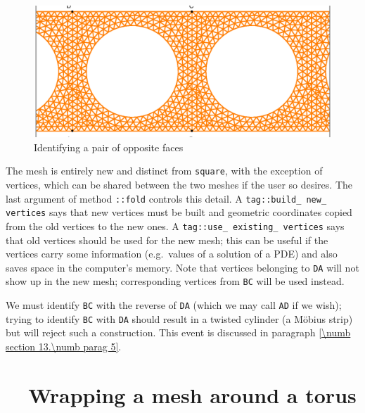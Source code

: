 \begin{figure}[ht] \centering
  \includegraphics[width=120mm]{cylinder-1.eps}
  \caption{Identifying a pair of opposite faces}
  \label{\numb section 7.\numb fig 12}
\end{figure}

The mesh {\small\tt{}} is entirely new and distinct from {\small\tt square},
with the exception of vertices, which can be shared between the two meshes if the
user so desires.
The last argument of method {\small\tt{}::fold} controls this detail.
A {\small\tt\textcolor{tag}{tag}::build\_\,new\_\,vertices} says that new vertices must be built
and geometric coordinates copied from the old vertices to the new ones.
A {\small\tt\textcolor{tag}{tag}::use\_\,existing\_\,vertices} says that old vertices
should be used for the new mesh; this can be useful if the vertices carry some information
(e.g.\ values of a solution of a PDE) and also saves space in the computer's memory.
Note that vertices belonging to {\small\tt DA} will not show up in the
new mesh; corresponding vertices from {\small\tt BC} will be used instead.

We must identify {\small\tt BC} with the reverse of {\small\tt DA} (which we may call
{\small\tt AD} if we wish); trying to identify {\small\tt BC} with {\small\tt DA} should
result in a twisted cylinder (a M\"obius strip) but {\maniFEM} will reject such a construction.
This event is discussed in paragraph \ref{\numb section 13.\numb parag 5}.


\section{~~Wrapping a mesh around a torus}\label{\numb section 7.\numb parag 17}

